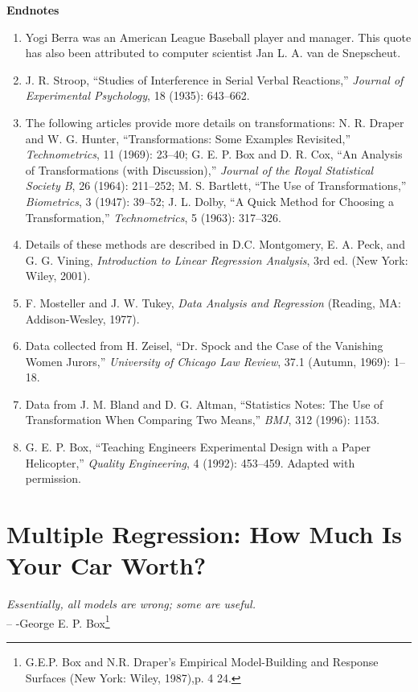 \documentclass[
]{book}
\begin{document}
\textbf{Endnotes}

\begin{enumerate}
  \item Yogi Berra was an American League Baseball player and manager. This quote has also been attributed to computer scientist Jan L. A. van de Snepscheut.
  \item J. R. Stroop, “Studies of Interference in Serial Verbal Reactions,” \textit{Journal of Experimental Psychology}, 18 (1935): 643–662.
  \item The following articles provide more details on transformations: N. R. Draper and W. G. Hunter, “Transformations: Some Examples Revisited,” \textit{Technometrics}, 11 (1969): 23–40; G. E. P. Box and D. R. Cox, “An Analysis of Transformations (with Discussion),” \textit{Journal of the Royal Statistical Society B}, 26 (1964): 211–252; M. S. Bartlett, “The Use of Transformations,” \textit{Biometrics}, 3 (1947): 39–52; J. L. Dolby, “A Quick Method for Choosing a Transformation,” \textit{Technometrics}, 5 (1963): 317–326.
  \item Details of these methods are described in D.C. Montgomery, E. A. Peck, and G. G. Vining, \textit{Introduction to Linear Regression Analysis}, 3rd ed. (New York: Wiley, 2001).
  \item F. Mosteller and J. W. Tukey, \textit{Data Analysis and Regression} (Reading, MA: Addison-Wesley, 1977).
  \item Data collected from H. Zeisel, “Dr. Spock and the Case of the Vanishing Women Jurors,” \textit{University of Chicago Law Review}, 37.1 (Autumn, 1969): 1–18.
  \item Data from J. M. Bland and D. G. Altman, “Statistics Notes: The Use of Transformation When Comparing Two Means,” \textit{BMJ}, 312 (1996): 1153.
  \item G. E. P. Box, “Teaching Engineers Experimental Design with a Paper Helicopter,” \textit{Quality Engineering}, 4 (1992): 453–459. Adapted with permission.
\end{enumerate}

\hypertarget{multiple-regression-how-much-is-your-car-worth}{%
\chapter{Multiple Regression: How Much Is Your Car Worth?}\label{multiple-regression-how-much-is-your-car-worth}}

\begin{flushright}
\emph{Essentially, all models are wrong; some are useful.} \\
-- -George E. P. Box\footnote{G.E.P. Box and N.R. Draper’s Empirical Model-Building and Response Surfaces (New York: Wiley, 1987),p. 4 24.}
\end{flushright}
\end{document}
